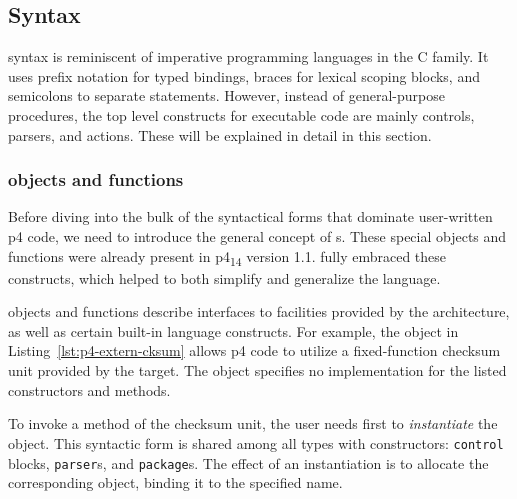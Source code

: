 \subsection{Syntax}




\pfs syntax is reminiscent of imperative programming languages in the C family.
It uses prefix notation for typed bindings, braces for lexical scoping blocks,
and semicolons to separate statements. However, instead of general-purpose
procedures, the top level constructs for executable code are mainly controls,
parsers, and actions. These will be explained in detail in this section.

\subsubsection*{\extern{} objects and functions}

Before diving into the bulk of the syntactical forms that dominate user-written
\acrshort{p4} code, we need to introduce the general concept of \extern{}s.
These special objects and functions were already present in
\acrshort{p4}\textsubscript{14} version 1.1. \pfs fully embraced these
constructs, which helped to both simplify and generalize the language.

\extern{} objects and functions describe interfaces to facilities provided by
the architecture, as well as certain built-in language constructs. For example, the \extern{} object in
Listing~\ref{lst:p4-extern-cksum} allows \acrshort{p4} code to utilize a
fixed-function checksum unit provided by the target. The object specifies no
implementation for the listed constructors and methods.

To invoke a method of the checksum unit, the user needs first to
\emph{instantiate} the \extern{} object. This syntactic form is shared among all
types with constructors: \texttt{control} blocks, \texttt{parser}s, and
\texttt{package}s. The effect of an instantiation
is to allocate the corresponding object, binding it to the specified name.

